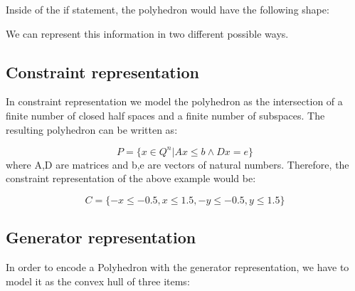 Inside of the if statement, the polyhedron would have the following shape:


\begin{center}
\end{center}
We can represent this information in two different possible ways.
\subsection{Constraint representation}
In constraint representation we model the polyhedron as the intersection of a finite number of closed half spaces and a finite number of subspaces. The resulting polyhedron can be written as:

\begin{equation}
	P=\{x\in Q^n |Ax\leq b \wedge Dx=e\}
\end{equation}
where A,D are matrices and b,e are vectors of natural numbers. Therefore, the constraint representation of the above example would be:

\begin{equation}
	C = \{-x \leq -0.5,x\leq 1.5 , -y \leq -0.5 ,y\leq 1.5\}
\end{equation}

\subsection{Generator representation}
In order to encode a Polyhedron with the generator representation, we have to model it as the convex hull of three items: 

